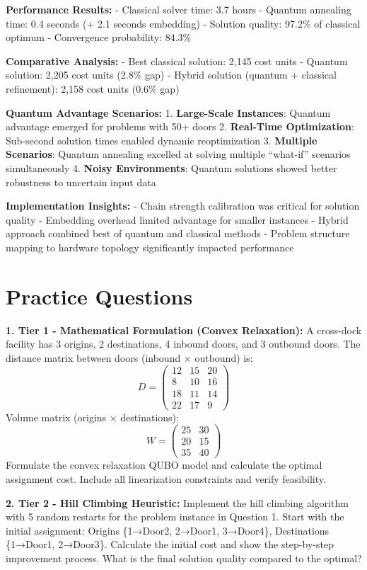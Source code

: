 \documentclass{article}
\begin{document}
\textbf{Performance Results:}
- Classical solver time: 3.7 hours
- Quantum annealing time: 0.4 seconds (+ 2.1 seconds embedding)
- Solution quality: 97.2\% of classical optimum
- Convergence probability: 84.3\%

\textbf{Comparative Analysis:}
- Best classical solution: 2,145 cost units
- Quantum solution: 2,205 cost units (2.8\% gap)
- Hybrid solution (quantum + classical refinement): 2,158 cost units (0.6\% gap)

\textbf{Quantum Advantage Scenarios:}
1. \textbf{Large-Scale Instances}: Quantum advantage emerged for problems with 50+ doors
2. \textbf{Real-Time Optimization}: Sub-second solution times enabled dynamic reoptimization
3. \textbf{Multiple Scenarios}: Quantum annealing excelled at solving multiple ``what-if'' scenarios simultaneously
4. \textbf{Noisy Environments}: Quantum solutions showed better robustness to uncertain input data

\textbf{Implementation Insights:}
- Chain strength calibration was critical for solution quality
- Embedding overhead limited advantage for smaller instances
- Hybrid approach combined best of quantum and classical methods
- Problem structure mapping to hardware topology significantly impacted performance

\section{Practice Questions}

\textbf{1. Tier 1 - Mathematical Formulation (Convex Relaxation):}
A cross-dock facility has 3 origins, 2 destinations, 4 inbound doors, and 3 outbound doors. The distance matrix between doors (inbound × outbound) is:
\[
D = \begin{pmatrix}
12 & 15 & 20 \\
8 & 10 & 16 \\
18 & 11 & 14 \\
22 & 17 & 9
\end{pmatrix}
\]
Volume matrix (origins × destinations):
\[
W = \begin{pmatrix}
25 & 30 \\
20 & 15 \\
35 & 40
\end{pmatrix}
\]
Formulate the convex relaxation QUBO model and calculate the optimal assignment cost. Include all linearization constraints and verify feasibility.

\textbf{2. Tier 2 - Hill Climbing Heuristic:}
Implement the hill climbing algorithm with 5 random restarts for the problem instance in Question 1. Start with the initial assignment: Origins \{1→Door2, 2→Door1, 3→Door4\}, Destinations \{1→Door1, 2→Door3\}. Calculate the initial cost and show the step-by-step improvement process. What is the final solution quality compared to the optimal?
\end{document}
